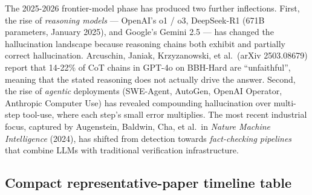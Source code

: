 \documentclass{article}
\begin{document}
The 2025-2026 frontier-model phase has produced two further inflections. First, the rise of \emph{reasoning models} --- OpenAI's o1 / o3, DeepSeek-R1 (671B parameters, January 2025), and Google's Gemini 2.5 --- has changed the hallucination landscape because reasoning chains both exhibit and partially correct hallucination. Arcuschin, Janiak, Krzyzanowski, et al.~(arXiv 2503.08679) report that 14-22\% of CoT chains in GPT-4o on BBH-Hard are ``unfaithful'', meaning that the stated reasoning does not actually drive the answer. Second, the rise of \emph{agentic} deployments (SWE-Agent, AutoGen, OpenAI Operator, Anthropic Computer Use) has revealed compounding hallucination over multi-step tool-use, where each step's small error multiplies. The most recent industrial focus, captured by Augenstein, Baldwin, Cha, et al.~in \emph{Nature Machine Intelligence} (2024), has shifted from detection towards \emph{fact-checking pipelines} that combine LLMs with traditional verification infrastructure.

\subsection{Compact representative-paper timeline table}\label{compact-representative-paper-timeline-table}
\end{document}
